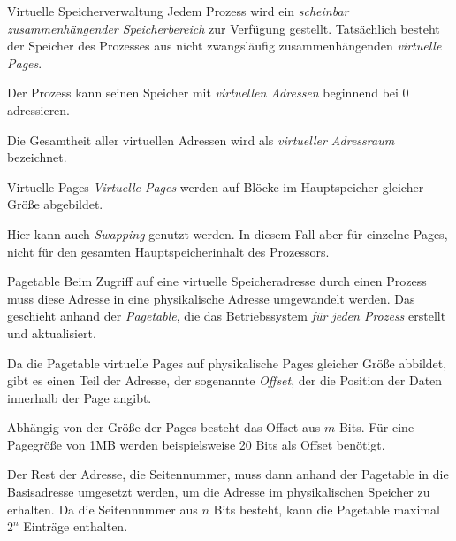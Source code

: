 \begin{defi}{Virtuelle Speicherverwaltung}
    Jedem Prozess wird ein \emph{scheinbar zusammenhängender Speicherbereich} zur Verfügung gestellt.
    Tatsächlich besteht der Speicher des Prozesses aus nicht zwangsläufig zusammenhängenden \emph{virtuelle Pages}.

    Der Prozess kann seinen Speicher mit \emph{virtuellen Adressen} beginnend bei 0 adressieren.

    Die Gesamtheit aller virtuellen Adressen wird als \emph{virtueller Adressraum} bezeichnet.
\end{defi}

\begin{defi}{Virtuelle Pages}
    \emph{Virtuelle Pages} werden auf Blöcke im Hauptspeicher gleicher Größe abgebildet.

    Hier kann auch \emph{Swapping} genutzt werden. In diesem Fall aber für einzelne Pages, nicht für den gesamten Hauptspeicherinhalt des Prozessors.
\end{defi}

\begin{defi}{Pagetable}
    Beim Zugriff auf eine virtuelle Speicheradresse durch einen Prozess muss diese
    Adresse in eine physikalische Adresse umgewandelt werden. Das geschieht anhand
    der \emph{Pagetable}, die das Betriebssystem \emph{für jeden Prozess} erstellt und aktualisiert.

    Da
    die Pagetable virtuelle Pages auf physikalische Pages gleicher Größe abbildet, gibt es einen Teil der Adresse, der sogenannte \emph{Offset}, der die Position der Daten innerhalb
    der Page angibt.

    Abhängig von
    der Größe der Pages besteht das Offset aus $m$ Bits.
    Für eine Pagegröße von 1MB
    werden beispielsweise 20 Bits als Offset benötigt.

    Der Rest der Adresse, die Seitennummer,
    muss dann anhand der Pagetable in die Basisadresse umgesetzt werden,
    um die Adresse im physikalischen Speicher zu erhalten. Da die Seitennummer aus
    $n$ Bits besteht, kann die Pagetable maximal $2^n$ Einträge enthalten.
\end{defi}

